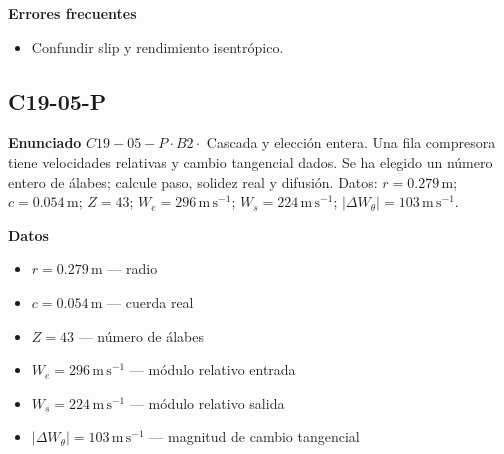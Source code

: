 \documentclass[10pt,openany]{book}
\begin{document}
\noindent\textbf{Errores frecuentes}
\begin{itemize}
\item Confundir slip y rendimiento isentrópico.
\end{itemize}
\begin{center}\end{center}
\subsection*{C19-05-P}

\noindent\textbf{Enunciado}
\(C19-05-P \cdot B2 \cdot\) Cascada y elección entera. Una fila compresora tiene velocidades relativas y cambio tangencial dados. Se ha elegido un número entero de álabes; calcule paso, solidez real y difusión. Datos: \(r=0.279\, \mathrm{m}\); \(c=0.054\, \mathrm{m}\); \(Z=43\); \(W_e=296\, \mathrm{m}\,\mathrm{s}^{-1}\); \(W_s=224\, \mathrm{m}\,\mathrm{s}^{-1}\); \(|\Delta W_\theta|=103\, \mathrm{m}\,\mathrm{s}^{-1}\).

\noindent\textbf{Datos}
\begin{itemize}
\item $r = 0.279\,\mathrm{m}$ — radio
\item $c = 0.054\,\mathrm{m}$ — cuerda real
\item $Z = 43$ — número de álabes
\item $W_e = 296\,\mathrm{m}\,\mathrm{s}^{-1}$ — módulo relativo entrada
\item $W_s = 224\,\mathrm{m}\,\mathrm{s}^{-1}$ — módulo relativo salida
\item $|\Delta W_\theta| = 103\,\mathrm{m}\,\mathrm{s}^{-1}$ — magnitud de cambio tangencial
\end{itemize}
\end{document}
